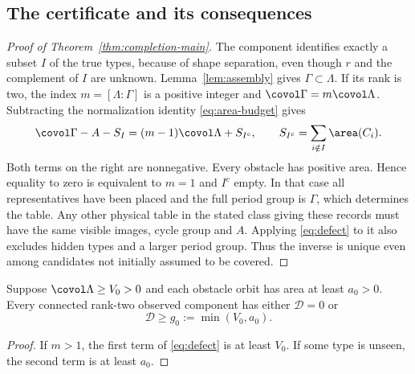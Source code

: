 \subsection{The certificate and its consequences}
\begin{proof}[Proof of Theorem~\ref{thm:completion-main}]
The component identifies exactly a subset $I$ of the true types, because
of shape separation, even though $r$ and the complement of $I$ are
unknown. Lemma~\ref{lem:assembly} gives $\Gamma\subset\Lambda$.
If its rank is two, the index $m=[\Lambda:\Gamma]$ is a positive
integer and $\covol\Gamma=m\covol\Lambda$. Subtracting the
normalization identity \eqref{eq:area-budget} gives
\begin{equation}\label{eq:defect}
 \covol\Gamma-A-S_I=(m-1)\covol\Lambda+S_{I^c},\qquad
 S_{I^c}=\sum_{i\notin I}\area(C_i).
\end{equation}
Both terms on the right are nonnegative. Every obstacle has positive
area. Hence equality to zero is equivalent to $m=1$ and $I^c$ empty.
In that case all representatives have been placed and the full period
group is $\Gamma$, which determines the table. Any other physical
table in the stated class giving these records must have the same
visible images, cycle group and $A$. Applying \eqref{eq:defect} to it
also excludes hidden types and a larger period group. Thus the inverse
is unique even among candidates not initially assumed to be covered.
\end{proof}

\begin{corollary}
\label{cor:defect-gap}
Suppose $\covol\Lambda\ge V_0>0$ and each obstacle orbit has area at
least $a_0>0$. Every connected rank-two observed component has either
$\mathcal D=0$ or
\begin{equation}\label{eq:defect-gap}
                    \mathcal D\ge g_0:=\min(V_0,a_0).
\end{equation}
\end{corollary}
\begin{proof}
If $m>1$, the first term of \eqref{eq:defect} is at least $V_0$.
If some type is unseen, the second term is at least $a_0$.
\end{proof}

